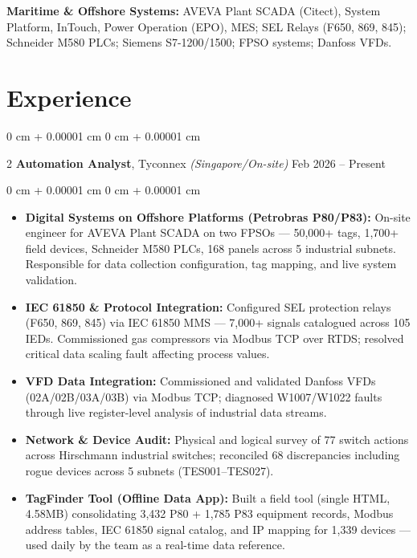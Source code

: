 \documentclass[10pt, letterpaper]{article}
\newenvironment{highlights}{ \begin{itemize}[ topsep=0.10 cm, parsep=0.10 cm, partopsep=0pt,
itemsep=0pt, leftmargin=0 cm + 10pt ] }{ \end{itemize} }
\newenvironment{onecolentry}{ \begin{adjustwidth}{ 0 cm + 0.00001 cm }{ 0 cm + 0.00001 cm }
}{ \end{adjustwidth} }
\newenvironment{twocolentry}[2][]{ \onecolentry \def\secondColumn{#2} \setcolumnwidth{\fill, 4.5 cm}
\begin{paracol}{2} }{ \switchcolumn \raggedleft \secondColumn \end{paracol}
\endonecolentry }
\begin{document}
    \textbf{Maritime \& Offshore Systems:} AVEVA Plant SCADA (Citect), System Platform, InTouch, Power Operation (EPO), MES; SEL Relays (F650, 869, 845); Schneider M580 PLCs; Siemens S7-1200/1500; FPSO systems; Danfoss VFDs.

	\section{Experience}

	\begin{twocolentry}
		{ Feb 2026 -- Present } \textbf{Automation Analyst}, Tyconnex \textit{(Singapore/On-site)}
	\end{twocolentry}

	\vspace{0.10 cm}
	\begin{onecolentry}
		\begin{highlights}
			\item \textbf{Digital Systems on Offshore Platforms (Petrobras P80/P83):} On-site engineer for AVEVA Plant SCADA on two FPSOs --- 50,000+ tags, 1,700+ field devices, Schneider M580 PLCs, 168 panels across 5 industrial subnets. Responsible for data collection configuration, tag mapping, and live system validation.
            \item \textbf{IEC 61850 \& Protocol Integration:} Configured SEL protection relays (F650, 869, 845) via IEC 61850 MMS --- 7,000+ signals catalogued across 105 IEDs. Commissioned gas compressors via Modbus TCP over RTDS; resolved critical data scaling fault affecting process values.
            \item \textbf{VFD Data Integration:} Commissioned and validated Danfoss VFDs (02A/02B/03A/03B) via Modbus TCP; diagnosed W1007/W1022 faults through live register-level analysis of industrial data streams.
			\item \textbf{Network \& Device Audit:} Physical and logical survey of 77 switch actions across Hirschmann industrial switches; reconciled 68 discrepancies including rogue devices across 5 subnets (TES001--TES027).
            \item \textbf{TagFinder Tool (Offline Data App):} Built a field tool (single HTML, 4.58MB) consolidating 3,432 P80 + 1,785 P83 equipment records, Modbus address tables, IEC 61850 signal catalog, and IP mapping for 1,339 devices --- used daily by the team as a real-time data reference.
		\end{highlights}
	\end{onecolentry}
\end{document}
